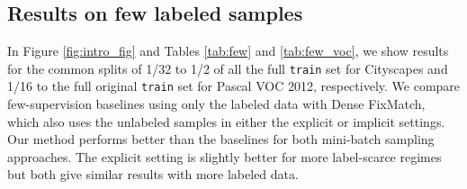 \subsection{Results on few labeled samples}
In Figure \ref{fig:intro_fig} and Tables \ref{tab:few} and \ref{tab:few_voc}, we show results for the common splits of 1/32 to 1/2 of all the full \texttt{train} set for Cityscapes and 1/16 to the full original \texttt{train} set for Pascal VOC 2012, respectively. We compare few-supervision baselines using only the labeled data with Dense FixMatch, which also uses the unlabeled samples in either the explicit or implicit settings. Our method performs better than the baselines for both mini-batch sampling approaches. The explicit setting is slightly better for more label-scarce regimes but both give similar results with more labeled data.




